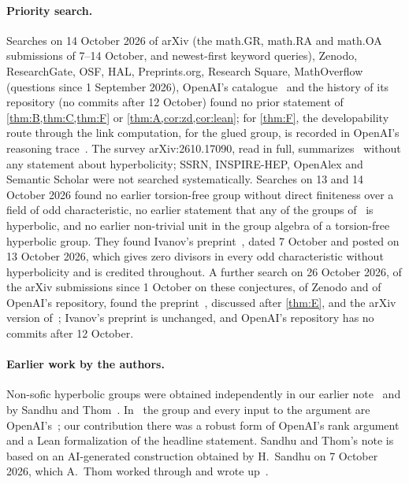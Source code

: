 \documentclass[11pt]{article}
\theoremstyle{definition}
\theoremstyle{plain}
\begin{document}
\paragraph{Priority search.} Searches on 14 October 2026 of arXiv (the math.GR, math.RA and math.OA submissions of 7--14 October, and newest-first keyword queries), Zenodo, ResearchGate, OSF, HAL, Preprints.org, Research Square, MathOverflow (questions since 1 September 2026), OpenAI's catalogue~\cite{OAIcatalog} and the history of its repository (no commits after 12 October) found no prior statement of \cref{thm:B,thm:C,thm:F} or \cref{thm:A,cor:zd,cor:lean}; for \cref{thm:F}, the developability route through the link computation, for the glued group, is recorded in OpenAI's reasoning trace~\cite[\S\S12, 17 and~21]{OAItrace}. The survey arXiv:2610.17090, read in full, summarizes~\cite{OAI196,OAI197b} without any statement about hyperbolicity; SSRN, INSPIRE-HEP, OpenAlex and Semantic Scholar were not searched systematically. Searches on 13 and 14 October 2026 found no earlier torsion-free group without direct finiteness over a field of odd characteristic, no earlier statement that any of the groups of~\cite{OAI196,OAI197a} is hyperbolic, and no earlier non-trivial unit in the group algebra of a torsion-free hyperbolic group. They found Ivanov's preprint~\cite{Ivanov2026}, dated 7 October and posted on 13 October 2026, which gives zero divisors in every odd characteristic without hyperbolicity and is credited throughout. A further search on 26 October 2026, of the arXiv submissions since 1 October on these conjectures, of Zenodo and of OpenAI's repository, found the preprint~\cite{BLMM2026}, discussed after \cref{thm:E}, and the arXiv version of~\cite{SandhuThom2026}; Ivanov's preprint is unchanged, and OpenAI's repository has no commits after 12 October.

\paragraph{Earlier work by the authors.} Non-sofic hyperbolic groups were obtained independently in our earlier note~\cite{DouglasMghirbi2026} and by Sandhu and Thom~\cite{SandhuThom2026}. In~\cite{DouglasMghirbi2026} the group and every input to the argument are OpenAI's~\cite{OAI252}; our contribution there was a robust form of OpenAI's rank argument and a Lean formalization of the headline statement. Sandhu and Thom's note is based on an AI-generated construction obtained by H.~Sandhu on 7 October 2026, which A.~Thom worked through and wrote up~\cite[Acknowledgments]{SandhuThom2026}.
\end{document}

